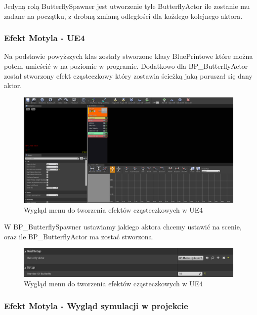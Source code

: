 \documentclass[a4paper,12pt,reqno]{article}
\begin{document}


Jedyną rolą ButterflySpawner jest utworzenie tyle ButterflyActor ile zostanie mu zadane na początku, z drobną zmianą odległości dla każdego kolejnego aktora.




\subsubsection{Efekt Motyla - UE4}

Na podstawie powyższych klas zostały stworzone klasy BluePrintowe które można potem umieścić w na poziomie w programie. Dodatkowo dla BP\_ButterflyActor został stworzony efekt cząsteczkowy który zostawia ścieżką jaką poruszał się dany aktor.

\begin{figure}[H]%
\centering
\includegraphics[width=0.7\columnwidth]{graphics/butterfly/ButterflyParticleSystem.png}
\caption{Wygląd menu do tworzenia efektów cząsteczkowych w UE4 
\label{BPExample}}%
%
\qquad
\end{figure} 


W BP\_ButterflySpawner ustawiamy jakiego aktora chcemy ustawić na scenie, oraz ile BP\_ButterflyActor  ma zostać stworzona.

\begin{figure}[H]%
\centering
\includegraphics[width=0.7\columnwidth]{graphics/butterfly/ButterflySpawner.png}
\caption{Wygląd menu do tworzenia efektów cząsteczkowych w UE4 
\label{BPExample}}%
%
\qquad
\end{figure} 

\subsubsection{Efekt Motyla - Wygląd symulacji w projekcie}
\end{document}
